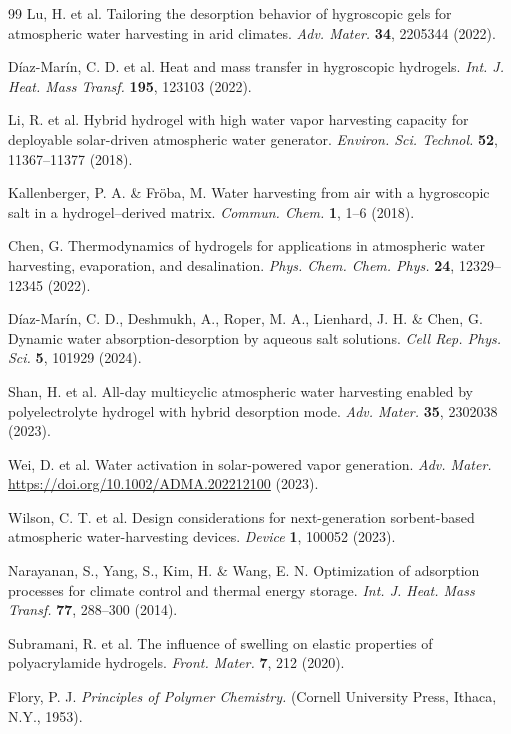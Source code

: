 \documentclass[11pt]{article}
\begin{document}
\begin{thebibliography}{99}
 Lu, H. et al. Tailoring the desorption behavior of hygroscopic gels for atmospheric water harvesting in arid climates. \textit{Adv. Mater.} \textbf{34}, 2205344 (2022).

 D\'iaz-Mar\'in, C. D. et al. Heat and mass transfer in hygroscopic hydrogels. \textit{Int. J. Heat. Mass Transf.} \textbf{195}, 123103 (2022).

 Li, R. et al. Hybrid hydrogel with high water vapor harvesting capacity for deployable solar-driven atmospheric water generator. \textit{Environ. Sci. Technol.} \textbf{52}, 11367--11377 (2018).

 Kallenberger, P. A. \& Fr\"oba, M. Water harvesting from air with a hygroscopic salt in a hydrogel--derived matrix. \textit{Commun. Chem.} \textbf{1}, 1--6 (2018).

 Chen, G. Thermodynamics of hydrogels for applications in atmospheric water harvesting, evaporation, and desalination. \textit{Phys. Chem. Chem. Phys.} \textbf{24}, 12329--12345 (2022).

 D\'iaz-Mar\'in, C. D., Deshmukh, A., Roper, M. A., Lienhard, J. H. \& Chen, G. Dynamic water absorption-desorption by aqueous salt solutions. \textit{Cell Rep. Phys. Sci.} \textbf{5}, 101929 (2024).

 Shan, H. et al. All-day multicyclic atmospheric water harvesting enabled by polyelectrolyte hydrogel with hybrid desorption mode. \textit{Adv. Mater.} \textbf{35}, 2302038 (2023).

 Wei, D. et al. Water activation in solar-powered vapor generation. \textit{Adv. Mater.} \url{https://doi.org/10.1002/ADMA.202212100} (2023).

 Wilson, C. T. et al. Design considerations for next-generation sorbent-based atmospheric water-harvesting devices. \textit{Device} \textbf{1}, 100052 (2023).

 Narayanan, S., Yang, S., Kim, H. \& Wang, E. N. Optimization of adsorption processes for climate control and thermal energy storage. \textit{Int. J. Heat. Mass Transf.} \textbf{77}, 288--300 (2014).

 Subramani, R. et al. The influence of swelling on elastic properties of polyacrylamide hydrogels. \textit{Front. Mater.} \textbf{7}, 212 (2020).

 Flory, P. J. \textit{Principles of Polymer Chemistry.} (Cornell University Press, Ithaca, N.Y., 1953).


\end{thebibliography}
\end{document}
